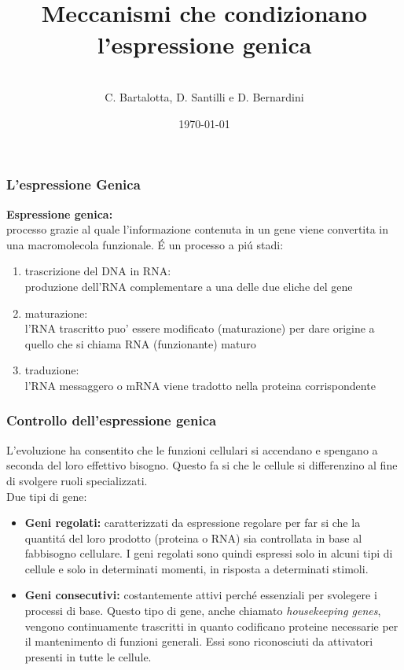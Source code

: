 \documentclass[hyperref={pdfpagelabels=false}]{beamer}
\title{\\Meccanismi che condizionano l'espressione genica\\}
\author{\\ C. Bartalotta, D. Santilli e D. Bernardini}
\date{\today}
\begin{document}


\begin{frame}
\titlepage
\end{frame} 


\begin{frame}\frametitle{L'espressione Genica}
\textbf{Espressione genica:}\\
processo grazie al quale l'informazione contenuta in un gene viene convertita in una macromolecola funzionale.
\'E un processo a pi\'u stadi:\pause 
\begin{enumerate}
\item trascrizione del DNA in RNA:\\
produzione dell'RNA complementare a una delle due eliche del gene  \pause 
\item maturazione:\\
l'RNA trascritto puo' essere modificato (maturazione) per dare origine a quello che si chiama RNA (funzionante) maturo \pause 
\item traduzione:\\
l'RNA messaggero o mRNA viene tradotto nella proteina corrispondente
\end{enumerate}
\end{frame}


\begin{frame}\frametitle{Controllo dell'espressione genica}
L'evoluzione ha consentito che le funzioni cellulari si accendano e spengano a seconda del loro effettivo bisogno. Questo fa si che le cellule si differenzino al fine di svolgere ruoli specializzati.
\\
Due tipi di gene:
\begin{itemize}
\item \textbf{Geni regolati:}  caratterizzati da espressione regolare per far si che la quantit\'a del loro prodotto (proteina o RNA) sia controllata in base al fabbisogno cellulare. I geni regolati sono quindi espressi solo in alcuni tipi di cellule e solo in determinati momenti, in risposta a determinati stimoli.
\item \textbf{Geni consecutivi:} costantemente attivi perch\'e essenziali per svolegere i processi di base. Questo tipo di gene, anche chiamato \emph{housekeeping genes}, vengono continuamente trascritti in quanto codificano proteine necessarie per il mantenimento di funzioni generali. Essi sono riconosciuti da attivatori  presenti in tutte le 
cellule.
\end{itemize}
\end{frame}
\end{document}
